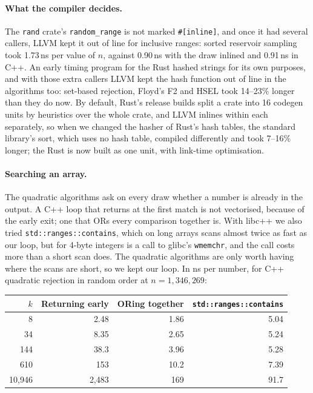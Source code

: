 \documentclass[letterpaper,11pt]{article}
\begin{document}
\paragraph{What the compiler decides.} The \texttt{rand}
crate's \texttt{random_range} is not marked
\texttt{#[inline]}, and once it had several callers, LLVM kept
it out of line for inclusive ranges: sorted reservoir sampling took
1.73\,ns per value of \(n\), against 0.90\,ns with the draw inlined and
0.91\,ns in C++. An early timing program for the Rust hashed strings
for its own purposes, and with those extra callers LLVM kept the hash
function out of line in the algorithms too: set-based rejection,
Floyd's F2 and HSEL took 14--23\% longer than they do now. By default,
Rust's release builds split a crate into 16 codegen units by heuristics
over the whole crate, and LLVM inlines within each separately, so when
we changed the hasher of Rust's hash tables, the standard library's
sort, which uses no hash table, compiled differently and took 7--16\%
longer; the Rust is now built as one unit, with link-time optimisation.

\paragraph{Searching an array.} The quadratic algorithms ask on every
draw whether a number is already in the output. A C++ loop that returns
at the first match is not vectorised, because of the early exit; one
that ORs every comparison together is. With libc++ we also tried
\texttt{std::ranges::contains}, which on long arrays scans
almost twice as fast as our loop, but for 4-byte integers is a call to
glibc's \texttt{wmemchr}, and the call costs more than a short
scan does. The quadratic algorithms are only worth having where the
scans are short, so we kept our loop. In ns per number, for C++
quadratic rejection in random order at \(n = 1{,}346{,}269\):

\begin{center}
    \small
    \begin{tabular}{r|r|r|r}
    \(k\) & Returning early & ORing together &
    \texttt{std::ranges::contains} \\
    \hline
    8 & 2.48 & 1.86 & 5.04 \\
    34 & 8.35 & 2.65 & 5.24 \\
    144 & 38.3 & 3.96 & 5.28 \\
    610 & 153 & 10.2 & 7.39 \\
    10,946 & 2,483 & 169 & 91.7
    \end{tabular}
\end{center}
\end{document}

